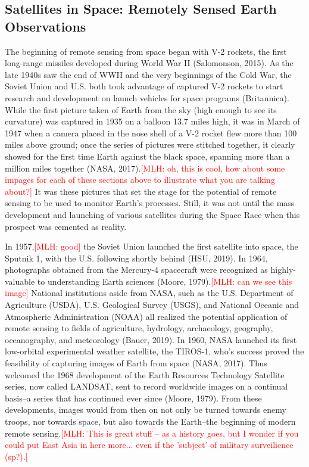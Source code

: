 \documentclass{book}\usepackage{knitr}
\newcommand{\red}[1]{\textcolor{red}{[MLH: #1]}}
\begin{document}
\subsection{Satellites in Space: Remotely Sensed Earth Observations}

The beginning of remote sensing from space began with V-2 rockets, the first long-range missiles developed during World War II (Salomonson, 2015). As the late 1940s saw the end of WWII and the very beginnings of the Cold War, the Soviet Union and U.S. both took advantage of captured V-2 rockets to start research and development on launch vehicles for space programs (Britannica). While the first picture taken of Earth from the sky (high enough to see its curvature) was captured in 1935 on a balloon 13.7 miles high, it was in March of 1947 when a camera placed in the nose shell of a V-2 rocket flew more than 100 miles above ground; once the series of pictures were stitched together, it clearly showed for the first time Earth against the black space, spanning more than a million miles together (NASA, 2017).\red{oh, this is cool, how about some impages for each of these sections above to illustrate what you are talking about?} It was these pictures that set the stage for the potential of remote sensing to be used to monitor Earth’s processes. Still, it was not until the mass development and launching of various satellites during the Space Race when this prospect was cemented as reality.

In 1957,\red{good} the Soviet Union launched the first satellite into space, the Sputnik 1, with the U.S. following shortly behind (HSU, 2019). In 1964, photographs obtained from the Mercury-4 spacecraft were recognized as highly-valuable to understanding Earth sciences (Moore, 1979).\red{can we see this image} National institutions aside from NASA, such as the U.S. Department of Agriculture (USDA), U.S. Geological Survey (USGS), and National Oceanic and Atmospheric Administration (NOAA) all realized the potential application of remote sensing to fields of agriculture, hydrology, archaeology, geography, oceanography, and meteorology (Bauer, 2019). In 1960, NASA launched its first low-orbital experimental weather satellite, the TIROS-1, who’s success proved the feasibility of capturing images of Earth from space (NASA, 2017). Thus welcomed the 1968 development of the Earth Resources Technology Satellite series, now called LANDSAT, sent to record worldwide images on a continual basis--a series that has continued ever since (Moore, 1979). From these developments, images would from then on not only be turned towards enemy troops, nor towards space, but also towards the Earth--the beginning of modern remote sensing.\red{This is great stuff -- as a history goes, but I wonder if you could put East Asia in here more... even if the 'subject' of military surveilience (sp?).}
\end{document}
